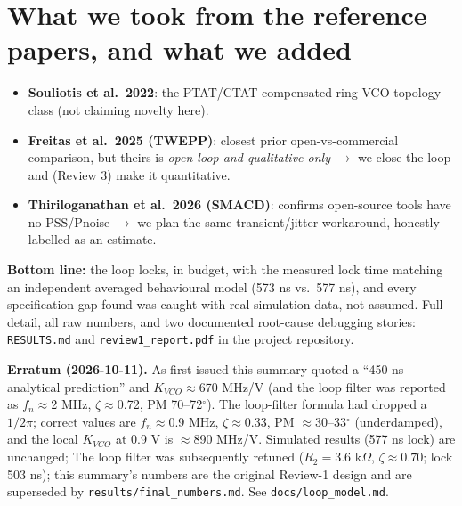 \documentclass[10pt]{article}
\begin{document}
\section{What we took from the reference papers, and what we added}
\begin{itemize}[leftmargin=1.3em, itemsep=1pt]
  \item \textbf{Souliotis et al.\ 2022}: the PTAT/CTAT-compensated ring-VCO topology class (not claiming novelty here).
  \item \textbf{Freitas et al.\ 2025 (TWEPP)}: closest prior open-vs-commercial comparison, but theirs is \emph{open-loop and qualitative only} $\to$ we close the loop and (Review 3) make it quantitative.
  \item \textbf{Thiriloganathan et al.\ 2026 (SMACD)}: confirms open-source tools have no PSS/Pnoise $\to$ we plan the same transient/jitter workaround, honestly labelled as an estimate.
\end{itemize}

\begin{finding}
\textbf{Bottom line:} the loop locks, in budget, with the measured lock time matching an independent averaged behavioural model (573 ns vs.\ 577 ns), and every specification gap found was caught with real simulation data, not assumed. Full detail, all raw numbers, and two documented root-cause debugging stories: \texttt{RESULTS.md} and \texttt{review1\_report.pdf} in the project repository.

\smallskip
\noindent\textbf{Erratum (2026-10-11).} As first issued this summary quoted a ``450 ns analytical prediction'' and $K_{VCO}\approx$670 MHz/V (and the loop filter was reported as $f_n\approx$2 MHz, $\zeta\approx$0.72, PM 70--72$^\circ$). The loop-filter formula had dropped a $1/2\pi$; correct values are $f_n\approx$0.9 MHz, $\zeta\approx$0.33, PM $\approx$30--33$^\circ$ (underdamped), and the local $K_{VCO}$ at 0.9 V is $\approx$890 MHz/V. Simulated results (577 ns lock) are unchanged; The loop filter was subsequently retuned ($R_2=3.6$ k$\Omega$, $\zeta\approx0.70$; lock 503 ns); this summary's numbers are the original Review-1 design and are superseded by \texttt{results/final\_numbers.md}. See \texttt{docs/loop\_model.md}.
\end{finding}
\end{document}
